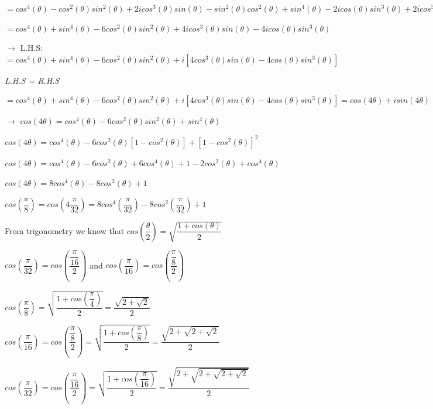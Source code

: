 \documentclass[fleqn]{article}
\begin{document}
\begin{enumerate}
    \bigbreak

    $=cos^4(\theta)-cos^2(\theta)sin^2(\theta)+2icos^3(\theta)sin(\theta)-sin^2(\theta)cos^2(\theta)+sin^4(\theta)-2icos(\theta)sin^3(\theta)+2icos^3(\theta)sin(\theta)-2icos(\theta)sin^3(\theta)-4cos^2(\theta)sin^2(\theta)$

    \bigbreak

    $=cos^4(\theta)+sin^4(\theta)-6cos^2(\theta)sin^2(\theta)+4icos^3(\theta)sin(\theta)-4icos(\theta)sin^3(\theta)$

    \bigbreak

    $\longrightarrow$ L.H.S: $=cos^4(\theta)+sin^4(\theta)-6cos^2(\theta)sin^2(\theta)+i[4cos^3(\theta)sin(\theta)-4cos(\theta)sin^3(\theta)]$ 

    \bigbreak

    \emph{L.H.S = R.H.S}

    $=cos^4(\theta)+sin^4(\theta)-6cos^2(\theta)sin^2(\theta)+i[4cos^3(\theta)sin(\theta)-4cos(\theta)sin^3(\theta)]=cos(4\theta)+isin(4\theta)$ 

    \bigbreak

    $\longrightarrow$ $cos(4\theta)=cos^4(\theta)-6cos^2(\theta)sin^2(\theta)+sin^4(\theta)$

    $cos(4\theta)=cos^4(\theta)-6cos^2(\theta)[1-cos^2(\theta)]+[1-cos^2(\theta)]^2$

    $cos(4\theta)=cos^4(\theta)-6cos^2(\theta)+6cos^4(\theta)+1-2cos^2(\theta)+cos^4(\theta)$

    $cos(4\theta)=8cos^4(\theta)-8cos^2(\theta)+1$ \thinspace \thinspace \thinspace  $\boxed{}$


    \bigbreak


    $cos(\dfrac{\pi}{8})=cos(4\dfrac{\pi}{32})=8cos^4(\dfrac{\pi}{32})-8cos^2(\dfrac{\pi}{32})+1$

    From trigonometry we know that $cos(\dfrac{\theta}{2})=\sqrt{\dfrac{1+cos(\theta)}{2}}$

    $cos(\dfrac{\pi}{32})=cos(\dfrac{\dfrac{\pi}{16}}{2})$ and $cos(\dfrac{\pi}{16})=cos(\dfrac{\dfrac{\pi}{8}}{2})$

    $cos(\dfrac{\pi}{8})=\sqrt{\dfrac{1+cos(\dfrac{\pi}{4})}{2}}=\dfrac{\sqrt{2+\sqrt{2}}}{2}$

    $cos(\dfrac{\pi}{16})=cos(\dfrac{\dfrac{\pi}{8}}{2})=\sqrt{\dfrac{1+cos(\dfrac{\pi}{8})}{2}}=\dfrac{\sqrt{2+\sqrt{2+\sqrt{2}}}}{2}$

    $cos(\dfrac{\pi}{32})=cos(\dfrac{\dfrac{\pi}{16}}{2})=\sqrt{\dfrac{1+cos(\dfrac{\pi}{16})}{2}}=\dfrac{\sqrt{2+\sqrt{2+\sqrt{2+\sqrt{2}}}}}{2}$


\end{enumerate}
\end{document}
